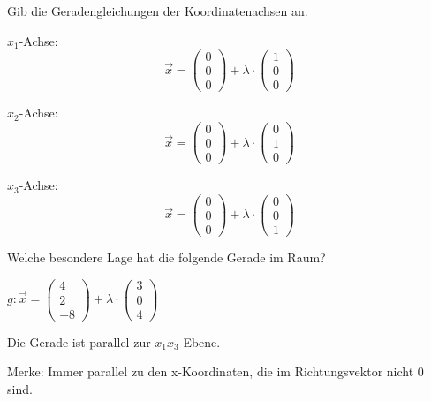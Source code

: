 \documentclass[paper=a6,ngerman,twoside=true,fontsize=14pt, parskip = half]{scrartcl}
\begin{document}
\begin{frage}
	Gib die Geradengleichungen der Koordinatenachsen an.
\end{frage}
\begin{antwort}
	$x_1$-Achse:
	\[\vec{x}=\left(\begin{array}{c} 0 \\ 0 \\ 0\end{array} \right)+\lambda \cdot \left(\begin{array}{c} 1 \\ 0 \\ 0\end{array} \right)\]
	
	$x_2$-Achse:
	\[\vec{x}=\left(\begin{array}{c} 0 \\ 0 \\ 0\end{array} \right)+\lambda \cdot \left(\begin{array}{c} 0 \\ 1 \\ 0\end{array} \right)\]
	
	$x_3$-Achse:
	\[\vec{x}=\left(\begin{array}{c} 0 \\ 0 \\ 0\end{array} \right)+\lambda \cdot \left(\begin{array}{c} 0 \\ 0 \\ 1\end{array} \right)\]
	
\end{antwort}	
\begin{frage}
	Welche besondere Lage hat die folgende Gerade im Raum?
	
	$g:\vec{x}=\left(\begin{array}{c} 4 \\ 2 \\ -8\end{array} \right)+\lambda \cdot \left(\begin{array}{c} 3 \\ 0 \\ 4\end{array} \right)$
\end{frage}
\begin{antwort}
	Die Gerade ist parallel zur $x_1x_3$-Ebene.
	
	Merke: Immer parallel zu den x-Koordinaten, die im Richtungsvektor nicht 0 sind.
	
\end{antwort}	
\end{document}
